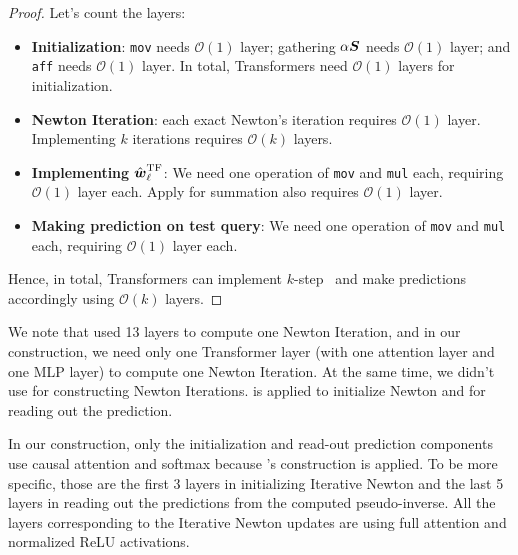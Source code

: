 \begin{proof}
Let's count the layers:
\begin{itemize}
    \item \textbf{Initialization}: \verb|mov| needs $\mathcal O(1)$ layer; gathering $\alpha \boldsymbol{S}$ needs $\mathcal O(1)$ layer; and \verb|aff| needs $\mathcal O(1)$ layer. In total, Transformers need $\mathcal O(1)$ layers for initialization. 
    \item \textbf{Newton Iteration}: each exact Newton's iteration requires $\mathcal O(1)$ layer. Implementing $k$ iterations requires $\mathcal O(k)$ layers.
    \item \textbf{Implementing $\hat{\boldsymbol{w}}_\ell^\mathrm{TF}$}: We need one operation of \verb|mov| and \verb|mul| each, requiring $\mathcal O(1)$ layer each. Apply  for summation also requires $\mathcal O(1)$ layer. 
    \item \textbf{Making prediction on test query}:  We need one operation of \verb|mov| and \verb|mul| each, requiring $\mathcal O(1)$ layer each.
\end{itemize}
Hence, in total, Transformers can implement $k$-step \newton\ and make predictions accordingly using $\mathcal{O}(k)$ layers. 
\end{proof}

{
\begin{remark}
We note that \cite{pmlr-v202-giannou23a} used 13 layers to compute one Newton Iteration, and in our construction, we need only one Transformer layer (with one attention layer and one MLP layer) to compute one Newton Iteration. At the same time, we didn’t use \cite{Akyrek2022WhatLA} for constructing Newton Iterations. \cite{Akyrek2022WhatLA} is applied to initialize Newton and for reading out the prediction. 

In our construction, only the initialization and read-out prediction components use causal attention and softmax because \cite{Akyrek2022WhatLA}'s construction is applied. To be more specific, those are the first 3 layers in initializing Iterative Newton and the last 5 layers in reading out the predictions from the computed pseudo-inverse. All the layers corresponding to the Iterative Newton updates are using full attention and normalized ReLU activations.
\end{remark}

}

